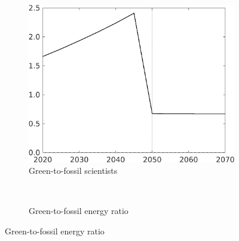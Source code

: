 \begin{figure}[h!!!]
\begin{subfigure}{0.4\textwidth}
	\end{subfigure}
	\begin{subfigure}{0.4\textwidth}
		\caption{Green-to-fossil scientists}
		\includegraphics[width=1\textwidth]{../../codding_model/own_basedOnFried/optimalPol_010922_revision/figures/all_13Sept22_Tplus30/sgsff_OPT_T_NoTaus_COMPtaulPer_regime4_spillover0_knspil1_noskill0_sep0_xgrowth0_PV1_etaa0.79.png}
	\end{subfigure}
\begin{minipage}[]{0.1\textwidth}
\
\end{minipage}
	\begin{subfigure}{0.4\textwidth}
		\caption{Green-to-fossil energy ratio}

\end{subfigure}
\end{figure}
